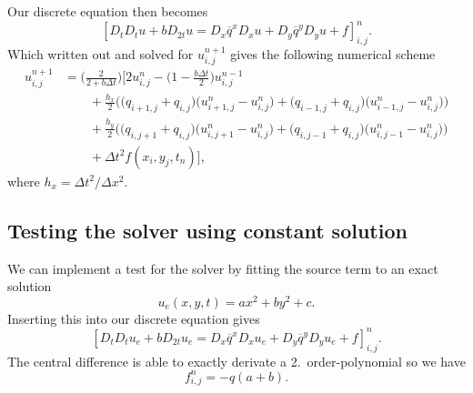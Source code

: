 \documentclass[a4paper, 11pt, notitlepage, english]{article}
\begin{document}
Our discrete equation then becomes
$$[D_tD_t u + bD_{2t}u = D_x \overline{q}^{x}D_x u + D_y \overline{q}^y D_y u + f]^{n}_{i,j}.$$
Which written out and solved for $u_{i,j}^{n+1}$ gives the following numerical scheme
\begin{align*}
u_{i,j}^{n+1} &= \bigg(\frac{2}{2+b\Delta t}\bigg)\Bigg[2u_{i,j}^n - \bigg(1-\frac{b\Delta t}{2}\bigg)u_{i,j}^{n-1} \\ 
&\qquad + \frac{h_x}{2}\bigg(\big(q_{i+1,j}+q_{i,j}\big)\big(u_{i+1,j}^n-u_{i,j}^n\big) + \big(q_{i-1,j} + q_{i,j}\big)\big(u_{i-1,j}^n-u_{i,j}^n\big)\bigg) \\
&\qquad + \frac{h_y}{2}\bigg(\big(q_{i,j+1}+q_{i,j}\big)\big(u_{i,j+1}^n-u_{i,j}^n\big) + \big(q_{i,j-1} + q_{i,j}\big)\big(u_{i,j-1}^n-u_{i,j}^n\big)\bigg) \\
&\qquad + \Delta t^2 f(x_i, y_j, t_n) \bigg],
\end{align*}
where $h_x = \Delta t^2/\Delta x^2$.

\subsection*{Testing the solver using constant solution}
We can implement a test for the solver by fitting the source term to an exact solution
$$u_e(x,y,t) = ax^2 + by^2 + c.$$
Inserting this into our discrete equation gives
$$[D_tD_t u_e + bD_{2t}u_e = D_x \overline{q}^{x}D_x u_e + D_y \overline{q}^y D_y u_e + f]^{n}_{i,j}.$$
The central difference is able to exactly derivate a 2.\ order-polynomial so we have
$$f^n_{i,j} = -q(a+b).$$
\end{document}
